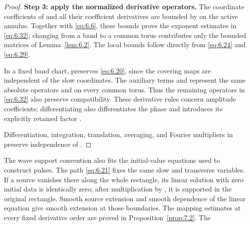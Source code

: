 \begin{proof}
\textbf{Step 3: apply the normalized derivative operators.} The coordinate
coefficients of  and all their coefficient derivatives
are bounded by
 on the active
annulus. Together with \eqref{eq:6.6}, these bounds prove the exponent
estimates in \eqref{eq:6.32}; changing from a band to a common torus
contributes only the bounded matrices of Lemma~\ref{lem:6.2}. The local
 bounds follow directly from \eqref{eq:6.24}
and \eqref{eq:6.29}.

In a fixed band chart,  preserves
\eqref{eq:6.20}, since the covering maps are independent of the slow
coordinates. The auxiliary terms
 and
 represent the same absolute operators
 and
 on every common torus. Thus the
remaining operators in \eqref{eq:6.32} also preserve compatibility. These
derivative rules concern amplitude coefficients; differentiating
 also differentiates the phase and
introduces its explicitly retained factor .

Differentiation, integration, translation, averaging, and Fourier multipliers
in  preserve independence of
.
\end{proof}

The wave support convention also fits the initial-value equations used to
construct pulses. The path \eqref{eq:6.21} fixes the same slow and transverse
variables. If a source vanishes there along the whole rectangle, its linear
solution with zero initial data is identically zero; after multiplication by
, it is supported in the original rectangle. Smooth
source extension and smooth dependence of the linear equation give smooth
extension at those boundaries. The mapping estimates at every fixed
derivative order are proved in Proposition~\ref{prop:7.2}. The

